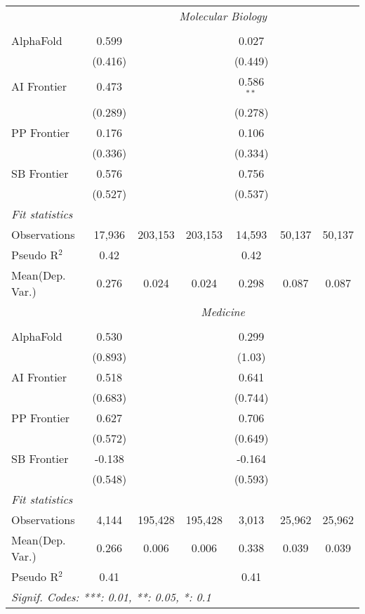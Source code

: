 \begin{tabular}{lcccccc}
 & \multicolumn{6}{c}{\textit{Molecular Biology}} \\ \\
   AlphaFold    & 0.599    &         &         & 0.027        &        &   \\   
                & (0.416)  &         &         & (0.449)      &        &   \\   
   AI Frontier  & 0.473    &         &         & 0.586$^{**}$ &        &   \\   
                & (0.289)  &         &         & (0.278)      &        &   \\   
   PP Frontier  & 0.176    &         &         & 0.106        &        &   \\   
                & (0.336)  &         &         & (0.334)      &        &   \\   
   SB Frontier  & 0.576    &         &         & 0.756        &        &   \\   
                & (0.527)  &         &         & (0.537)      &        &   \\   
   \midrule
   \emph{Fit statistics}\\
   Observations & 17,936   & 203,153 & 203,153 & 14,593       & 50,137 & 50,137\\  
   Pseudo R$^2$ & 0.42     &         &         & 0.42         &        & \\  
   
Mean(Dep. Var.) & 0.276 & 0.024 & 0.024 & 0.298 & 0.087 & 0.087 \\
 & \multicolumn{6}{c}{\textit{Medicine}} \\ \\
   AlphaFold    & 0.530    &         &         & 0.299   &        &   \\   
                & (0.893)  &         &         & (1.03)  &        &   \\   
   AI Frontier  & 0.518    &         &         & 0.641   &        &   \\   
                & (0.683)  &         &         & (0.744) &        &   \\   
   PP Frontier  & 0.627    &         &         & 0.706   &        &   \\   
                & (0.572)  &         &         & (0.649) &        &   \\   
   SB Frontier  & -0.138   &         &         & -0.164  &        &   \\   
                & (0.548)  &         &         & (0.593) &        &   \\   
   \midrule
   \emph{Fit statistics}\\
   Observations & 4,144    & 195,428 & 195,428 & 3,013   & 25,962 & 25,962\\  
Mean(Dep. Var.) & 0.266 & 0.006 & 0.006 & 0.338 & 0.039 & 0.039 \\
   Pseudo R$^2$ & 0.41     &         &         & 0.41    &        & \\  
   \midrule \midrule
   \multicolumn{7}{l}{\emph{Signif. Codes: ***: 0.01, **: 0.05, *: 0.1}}\\
\end{tabular}
\par\endgroup
